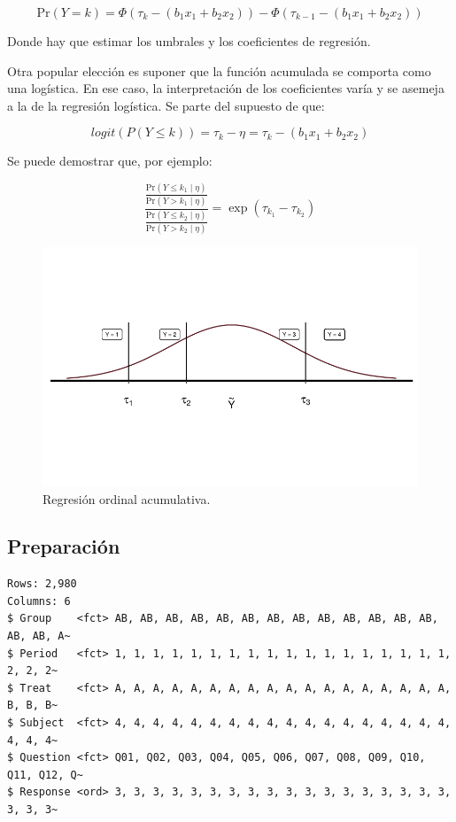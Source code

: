 \documentclass[
  letterpaper,
  DIV=11,
  numbers=noendperiod]{scrartcl}
\begin{document}
\[\mathrm{Pr}(Y = k) = \Phi(\tau_k - (b_1 x_1 + b_2 x_2)) - \Phi(\tau_{k - 1} - (b_1 x_1 + b_2 x_2))\]

Donde hay que estimar los umbrales y los coeficientes de regresión.

Otra popular elección es suponer que la función acumulada se comporta
como una logística. En ese caso, la interpretación de los coeficientes
varía y se asemeja a la de la regresión logística. Se parte del supuesto
de que:

\[logit (P(Y \le k)) = \tau_{k} - \eta = \tau_{k} - (b_1 x_1 + b_2 x_2)\]

Se puede demostrar que, por ejemplo:

\[\frac{\frac{\mathrm{Pr}(Y \leq k_1 \mid \eta)}{\mathrm{Pr}(Y > k_1 \mid \eta)}}{\frac{\mathrm{Pr}(Y \leq k_2 \mid \eta)}{\mathrm{Pr}(Y > k_2 \mid \eta)}} = \exp(\tau_{k_1} - \tau_{k_2})\]

\begin{figure}

{\centering \includegraphics{ordinal_files/figure-pdf/fig-cumulative-1.pdf}

}

\caption{\label{fig-cumulative}Regresión ordinal acumulativa.}

\end{figure}

\hypertarget{preparaciuxf3n}{%
\subsection{Preparación}\label{preparaciuxf3n}}

\begin{verbatim}
Rows: 2,980
Columns: 6
$ Group    <fct> AB, AB, AB, AB, AB, AB, AB, AB, AB, AB, AB, AB, AB, AB, AB, A~
$ Period   <fct> 1, 1, 1, 1, 1, 1, 1, 1, 1, 1, 1, 1, 1, 1, 1, 1, 1, 1, 2, 2, 2~
$ Treat    <fct> A, A, A, A, A, A, A, A, A, A, A, A, A, A, A, A, A, A, B, B, B~
$ Subject  <fct> 4, 4, 4, 4, 4, 4, 4, 4, 4, 4, 4, 4, 4, 4, 4, 4, 4, 4, 4, 4, 4~
$ Question <fct> Q01, Q02, Q03, Q04, Q05, Q06, Q07, Q08, Q09, Q10, Q11, Q12, Q~
$ Response <ord> 3, 3, 3, 3, 3, 3, 3, 3, 3, 3, 3, 3, 3, 3, 3, 3, 3, 3, 3, 3, 3~
\end{verbatim}
\end{document}
